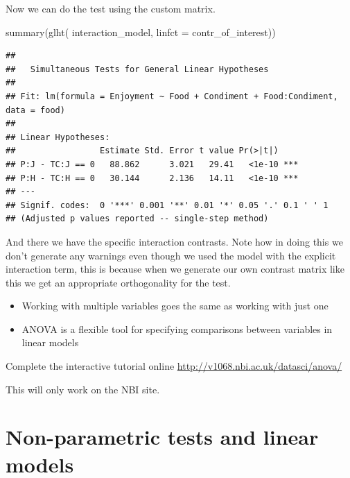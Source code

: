 \documentclass[
]{book}
\newenvironment{Shaded}{\begin{snugshade}}{\end{snugshade}}
\newcommand{\AttributeTok}[1]{\textcolor[rgb]{0.77,0.63,0.00}{#1}}
\newcommand{\FunctionTok}[1]{\textcolor[rgb]{0.00,0.00,0.00}{#1}}
\newcommand{\NormalTok}[1]{#1}
\providecommand{\tightlist}{%
  \setlength{\itemsep}{0pt}\setlength{\parskip}{0pt}}
\newenvironment{task}
{ \begin{tcolorbox}[title=For you to do,title filled] }
{  \end{tcolorbox} }
\newenvironment{roundup}
{ \begin{tcolorbox}[colbacktitle=yellow!50!white,
title=Round Up,coltitle=black,
fonttitle=\bfseries] }
{  \end{tcolorbox} }
\begin{document}
Now we can do the test using the custom matrix.

\begin{Shaded}
\begin{Highlighting}[]
\FunctionTok{summary}\NormalTok{(}\FunctionTok{glht}\NormalTok{( interaction\_model, }\AttributeTok{linfct =}\NormalTok{ contr\_of\_interest))}
\end{Highlighting}
\end{Shaded}

\begin{verbatim}
## 
## 	 Simultaneous Tests for General Linear Hypotheses
## 
## Fit: lm(formula = Enjoyment ~ Food + Condiment + Food:Condiment, data = food)
## 
## Linear Hypotheses:
##                 Estimate Std. Error t value Pr(>|t|)    
## P:J - TC:J == 0   88.862      3.021   29.41   <1e-10 ***
## P:H - TC:H == 0   30.144      2.136   14.11   <1e-10 ***
## ---
## Signif. codes:  0 '***' 0.001 '**' 0.01 '*' 0.05 '.' 0.1 ' ' 1
## (Adjusted p values reported -- single-step method)
\end{verbatim}

And there we have the specific interaction contrasts. Note how in doing this we don't generate any warnings even though we used the model with the explicit interaction term, this is because when we generate our own contrast matrix like this we get an appropriate orthogonality for the test.

\begin{roundup}
\begin{itemize}
\tightlist
\item
  Working with multiple variables goes the same as working with just one
\item
  ANOVA is a flexible tool for specifying comparisons between variables in linear models
\end{itemize}
\end{roundup}

\begin{task}
Complete the interactive tutorial online \url{http://v1068.nbi.ac.uk/datasci/anova/}

This will only work on the NBI site.
\end{task}

\hypertarget{non-parametric-tests-and-linear-models}{%
\chapter{Non-parametric tests and linear models}\label{non-parametric-tests-and-linear-models}}
\end{document}
